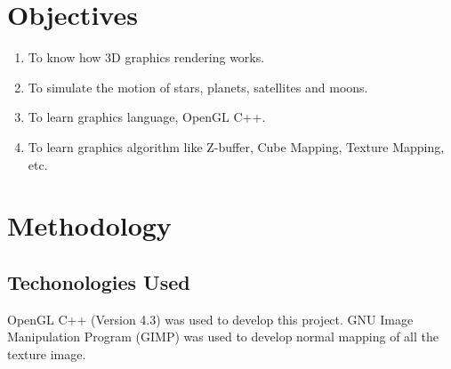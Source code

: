 \documentclass[12pt]{article}
\begin{document}
\section{Objectives}
\begin{enumerate}
	\item To know how 3D graphics rendering works.
	\item To simulate the motion of stars, planets, satellites and moons.
	\item To learn graphics language, OpenGL C++.
	\item To learn graphics algorithm like Z-buffer, Cube Mapping, Texture Mapping, etc. 
\end{enumerate}
   
\clearpage
\section{Methodology}
\subsection{Techonologies Used}
OpenGL C++ (Version 4.3) was used to develop this project. GNU Image Manipulation Program (GIMP) was used to develop normal mapping of all the texture image.
\end{document}
